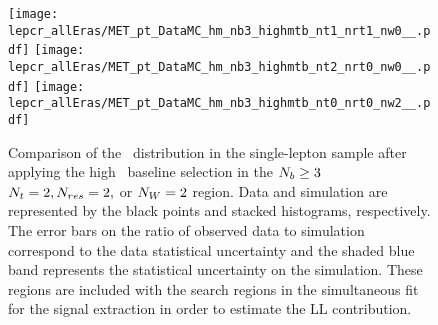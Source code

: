 \begin{figure}[!h]
	\begin{center} 
  \texttt{[image: lepcr\_allEras/MET\_pt\_DataMC\_hm\_nb3\_highmtb\_nt1\_nrt1\_nw0\_\_.pdf]}
  \texttt{[image: lepcr\_allEras/MET\_pt\_DataMC\_hm\_nb3\_highmtb\_nt2\_nrt0\_nw0\_\_.pdf]} 
  \texttt{[image: lepcr\_allEras/MET\_pt\_DataMC\_hm\_nb3\_highmtb\_nt0\_nrt0\_nw2\_\_.pdf]} \\
	\end{center}
	\caption[Lost Lepton HM Control Region $\nb\geq3$ with 2 heavy objects]{Comparison of the \met~distribution in the single-lepton sample after applying the high \dm~baseline selection in the $\nb\geq3$ $N_{t}=2, N_{res}=2,$ or $N_{W}=2$ region. Data and simulation are represented by the black points and stacked histograms, respectively. The error bars on the ratio of observed data to simulation correspond to the data statistical uncertainty and the shaded blue band represents the statistical uncertainty on the simulation. These regions are included with the search regions in the simultaneous fit for the signal extraction in order to estimate the LL contribution.
	 }
	\label{fig:llb-1lcr-datavsmc-hm-nb3-2}
\end{figure}

